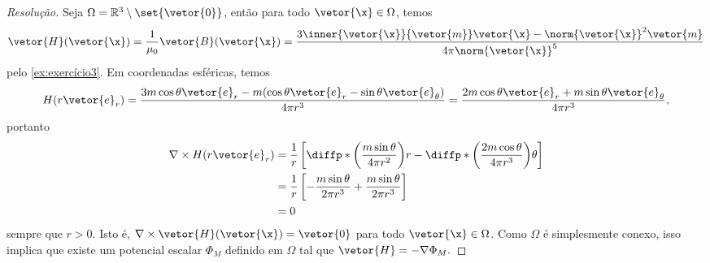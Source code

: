 \begin{proof}[Resolução]
    Seja \(\Omega = \mathbb{R}^3 \setminus \set{\vetor{0}}\), então  para todo \(\vetor{\x} \in \Omega\), temos
    \begin{equation*}
        \vetor{H}(\vetor{\x}) = \frac{1}{\mu_0}\vetor{B}(\vetor{\x}) = \frac{3\inner{\vetor{\x}}{\vetor{m}}\vetor{\x} - \norm{\vetor{\x}}^2 \vetor{m}}{4\pi \norm{\vetor{\x}}^5}
    \end{equation*}
    pelo \cref{ex:exercício3}. Em coordenadas esféricas, temos
    \begin{equation*}
        H(r\vetor{e}_r) = \frac{3 m \cos\theta \vetor{e}_r - m (\cos\theta \vetor{e}_r - \sin\theta \vetor{e}_\theta)}{4\pi r^3} = \frac{2m \cos\theta \vetor{e}_r + m\sin\theta \vetor{e}_\theta}{4\pi r^3},
    \end{equation*}
    portanto
    \begin{align*}
        \nabla \times H(r \vetor{e}_r) &= \frac{1}{r} \left[\diffp*{\left(\frac{m\sin\theta}{4\pi r^2}\right)}{r} - \diffp*{\left(\frac{2m \cos\theta}{4\pi r^3}\right)}{\theta}\right]\\
                                       &= \frac1r\left[-\frac{m\sin\theta}{2\pi r^3} + \frac{m \sin\theta}{2\pi r^3}\right]\\
                                       &= 0
    \end{align*}
    sempre que \(r > 0\). Isto é, \(\nabla \times \vetor{H}(\vetor{\x}) = \vetor{0}\) para todo \(\vetor{\x} \in \Omega\). Como \(\Omega\) é simplesmente conexo, isso implica que existe um potencial escalar \(\Phi_M\) definido em \(\Omega\) tal que \(\vetor{H} =-\nabla \Phi_M.\)


\end{proof}
